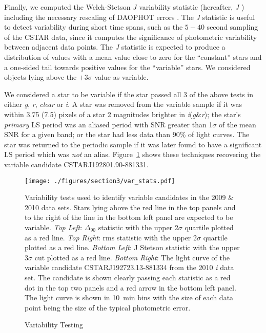 Finally, we computed the Welch-Stetson \textit{J} variability statistic (hereafter, \textit{J} \citep{Stetson1996}) including the necessary rescaling of DAOPHOT errors \citep{Kaluzny1998}. The \textit{J} statistic is useful to detect variability during short time spans, such as the $5-40$ second sampling of the CSTAR data, since it computes the significance of photometric variability between adjacent data points. The \textit{J} statistic is expected to produce a distribution of values with a mean value close to zero for the ``constant'' stars and a one-sided tail towards positive values for the ``variable'' stars. We considered objects lying above the $+3\sigma$ value as variable. 

We considered a star to be variable if the star passed all 3 of the above tests in either \textit{g}, \textit{r}, \textit{clear} or \textit{i}. A star was removed from the variable sample if it was within 3.75 (7.5) pixels of a star 2 magnitudes brighter in \textit{i}(\textit{g}\&\textit{r}); the star's \textit{primary} LS period was an aliased period with SNR greater than 1$\sigma$ of the mean SNR for a given band; or the star had less data than 90\% of light curves. The star was returned to the periodic sample if it was later found to have a significant LS period which was \textit{not} an alias. Figure~\ref{fig:stat} shows these techniques recovering the variable candidate CSTARJ192801.90-881331. 

\begin{figure}[H]
\begin{center}
\singlespace
\texttt{[image: ./figures/section3/var\_stats.pdf]}
\end{center}
\singlespace
\caption{Variability Testing}  Variability tests used to identify variable candidates in the 2009 \& 2010 data sets. Stars lying above the red line in the top panels and to the right of the line in the bottom left panel are expected to be variable. \textit{Top Left}: $\Delta_{90}$ statistic with the upper 2$\sigma$ quartile plotted as a red line. \textit{Top Right}: rms statistic with the upper 2$\sigma$ quartile plotted as a red line. \textit{Bottom Left}: J Stetson statistic with the upper 3$\sigma$ cut plotted as a red line. \textit{Bottom Right}: The light curve of the variable candidate CSTARJ192723.13-881334 from the 2010 \textit{i} data set. The candidate is shown clearly passing each statistic as a red dot in the top two panels and a red arrow in the bottom left panel. The light curve is shown in 10~min bins with the size of each data point being the size of the typical photometric error.\label{fig:stat}
\end{figure}

